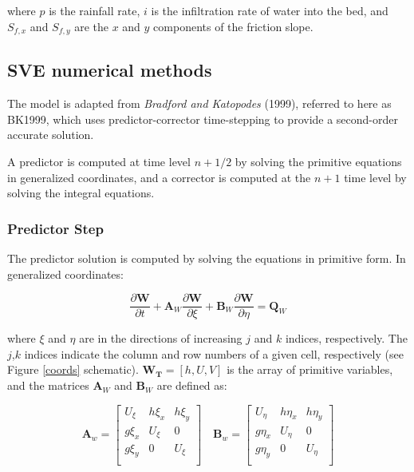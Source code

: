 \documentclass{article}
\begin{document}
where $p$ is the rainfall rate,   $i$ is the infiltration rate of water into the bed, and $S_{f,x}$ and $S_{f,y}$ are the $x$ and $y$ components of the friction slope. 


\subsection{SVE numerical methods}

 The model is adapted from  \textit{Bradford and Katopodes} (1999), referred to here as BK1999,  which uses predictor-corrector time-stepping to provide a second-order accurate solution.
  
  A predictor is computed at  time level $n + 1/2$ by solving the primitive equations in generalized coordinates, and a corrector is computed at the $n + 1$ time level by solving the integral equations.  
   
 \subsubsection*{Predictor Step}

 The predictor solution is computed by solving the equations in primitive form. In generalized coordinates:

\begin{equation}
\dfrac{\partial \mathbf{W}}{\partial t} + 
	\mathbf{A}_W	\dfrac{\partial \mathbf{W}}{\partial \xi} + 
	\mathbf{B}_W	\dfrac{\partial \mathbf{W}}{\partial \eta} =
	\mathbf{Q}_W
\label{predictor}
\end{equation}

\noindent where $\xi$ and $\eta$ are in the directions of increasing $j$ and $k$ indices, respectively.
The  $j$,$k$ indices indicate the column and row numbers of a given cell, respectively (see Figure \ref{coords} schematic).
$\mathbf{W_T} = [h, U, V]$ is the array of primitive variables, and the matrices $\mathbf{A}_W$ and $\mathbf{B}_W$ are defined as:

\[ \mathbf{A}_w = 
\begin{bmatrix}
    U_{\xi} & h \xi_x & h \xi_{y} \\
    g \xi_x &    U_{\xi}  & 0    \\
    g \xi_y &   0   & U_{\xi}    \\    
\end{bmatrix} \quad \mathbf{B}_w = 
\begin{bmatrix}
    U_{\eta} & h \eta_x    & h \eta_{y} \\
    g \eta_x &    U_{\eta}  & 0    \\
    g \eta_y &      0       & U_{\eta}    \\    
\end{bmatrix} 		
\]	
\end{document}
